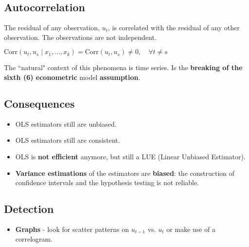 \documentclass[10pt, a4paper, landscape]{article}
\newcommand{\Corr}{\mathrm{Corr}}
\begin{document}
\begin{multicols}{3}
		\columnbreak
		
		\section*{Autocorrelation}
		
		The residual of any observation, $u_{t}$, is correlated with the residual of any other observation. The observations are not independent.
		
		\begin{center}
			$\Corr(u_{t}, u_{s} \mid x_{1}, \ldots, x_{k}) = \Corr(u_{t}, u_{s}) \neq 0, \quad \forall t \neq s$
		\end{center}
		
		The ``natural" context of this phenomena is time series. Is the \textbf{breaking of the sixth (6) econometric} model \textbf{assumption}.
		
		\subsection*{Consequences}
		
		\begin{itemize}[leftmargin=*]
			\item OLS estimators still are unbiased.
			\item OLS estimators still are consistent.
			\item OLS is \textbf{not efficient} anymore, but still a LUE (Linear Unbiased Estimator).
			\item \textbf{Variance estimations} of the estimators are \textbf{biased}: the construction of confidence intervals and the hypothesis testing is not reliable.
		\end{itemize}
		
		\subsection*{Detection}
		
		\begin{itemize}[leftmargin=*]
			\item \textbf{Graphs} - look for scatter patterns on $u_{t - 1}$ vs. $u_{t}$ or make use of a correlogram.
			
			\setlength{\multicolsep}{0pt}
			\setlength{\columnsep}{6pt}
			\begin{multicols}{3}
				\begin{center}
				\end{center}
				

\end{multicols}
\end{itemize}
\end{multicols}
\end{document}
